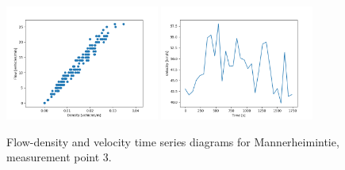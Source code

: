 \documentclass[english, 12pt, a4paper, elec, utf8, pdfa, online]{aaltothesis}
\begin{document}
\begin{figure}[ht!]
    \centering
    \includegraphics[width=0.45\textwidth]{graphs/Mannerheimintie_3_flw_dns.png}
    \includegraphics[width=0.45\textwidth]{graphs/Mannerheimintie_3_spd_time_6.png}
    \caption{Flow-density and velocity time series diagrams for Mannerheimintie, measurement point 3.}
\end{figure}
\end{document}
